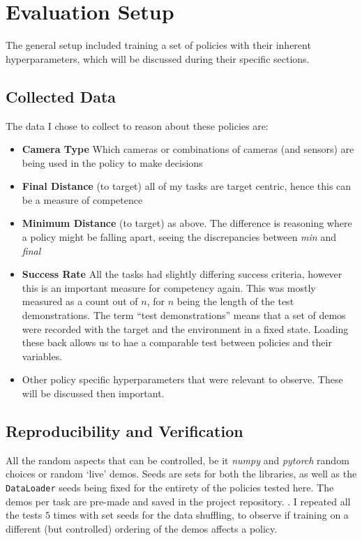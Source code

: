 \section{Evaluation Setup}
The general setup included training a set of policies with their inherent hyperparameters, which will be discussed during their specific sections.

\subsection{Collected Data}
The data I chose to collect to reason about these policies are:
\begin{itemize}
  \item \textbf{Camera Type} Which cameras or combinations of cameras (and sensors) are being used in the policy to make decisions
  \item \textbf{Final Distance} (to target) all of my tasks are target centric, hence this can be a measure of competence
  \item \textbf{Minimum Distance} (to target) as above. The difference is reasoning where a policy might be falling apart, seeing the discrepancies between \emph{min} and \emph{final}
  \item \textbf{Success Rate} All the tasks had slightly differing success criteria, however this is an important measure for competency again. This was mostly measured as a count out of $n$, for $n$ being the length of the test demonstrations. The term ``test demonstrations'' means that a set of demos were recorded with the target and the environment in a fixed state. Loading these back allows us to hae a comparable test between policies and their variables.
  \item Other policy specific hyperparameters that were relevant to observe. These will be discussed then important.
\end{itemize}

\subsection{Reproducibility and Verification}
All the random aspects that can be controlled, be it \emph{numpy} and \emph{pytorch} random choices or random `live' demos. Seeds are sets for both the libraries, as well as the \verb|DataLoader| seeds being fixed for the entirety of the policies tested here.
The demos per task are pre-made and saved in the project repository. . I repeated all the tests $5$ times with set seeds for the data shuffling, to observe if training on a different (but controlled) ordering of the demos affects a policy.

